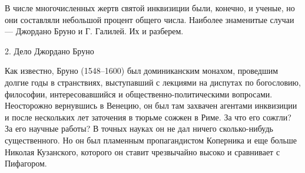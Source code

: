 В числе многочисленных жертв святой инквизиции были, конечно, и ученые, но они
составляли небольшой процент общего числа. Наиболее знаменитые случаи ---
Джордано Бруно и Г. Галилей. Их и разберем.

2. Дело Джордано Бруно

Как известно, Бруно (1548--1600) был доминиканским монахом, проведшим долгие
годы в странствиях, выступавший с лекциями на диспутах по богословию,
философии, интересовавшийся и общественно-политическими вопросами.
Неосторожно вернувшись в Венецию, он был там захвачен агентами инквизиции и
после нескольких лет заточения в тюрьме сожжен в Риме. За что его сожгли? За
его научные работы? В точных науках он не дал ничего сколько-нибудь
существенного. Но он был пламенным пропагандистом Коперника и еще больше
Николая Кузанского, которого он ставит чрезвычайно высоко и сравнивает с
Пифагором.

